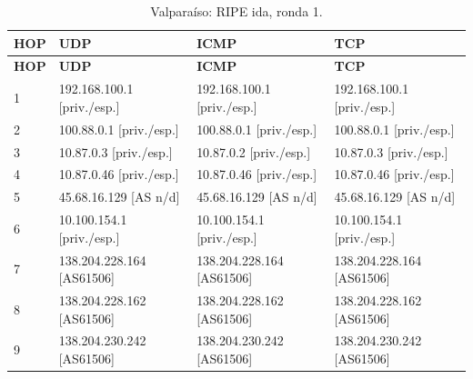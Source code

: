 \begin{longtable}{p{0.95cm}p{4.716666666666667cm}p{4.716666666666667cm}p{4.716666666666667cm}}
\caption{Valparaíso: RIPE ida, ronda 1.}\label{anexo:ripe:138.204.230.242:1} \\
\toprule
\textbf{HOP} & \textbf{UDP} & \textbf{ICMP} & \textbf{TCP} \\ \midrule
\endfirsthead
\toprule
\textbf{HOP} & \textbf{UDP} & \textbf{ICMP} & \textbf{TCP} \\ \midrule
\endhead
1 & 192.168.100.1 [priv./esp.] & 192.168.100.1 [priv./esp.] & 192.168.100.1 [priv./esp.] \\
2 & 100.88.0.1 [priv./esp.] & 100.88.0.1 [priv./esp.] & 100.88.0.1 [priv./esp.] \\
3 & 10.87.0.3 [priv./esp.] & 10.87.0.2 [priv./esp.] & 10.87.0.3 [priv./esp.] \\
4 & 10.87.0.46 [priv./esp.] & 10.87.0.46 [priv./esp.] & 10.87.0.46 [priv./esp.] \\
5 & 45.68.16.129 [AS n/d] & 45.68.16.129 [AS n/d] & 45.68.16.129 [AS n/d] \\
6 & 10.100.154.1 [priv./esp.] & 10.100.154.1 [priv./esp.] & 10.100.154.1 [priv./esp.] \\
7 & 138.204.228.164 [AS61506] & 138.204.228.164 [AS61506] & 138.204.228.164 [AS61506] \\
8 & 138.204.228.162 [AS61506] & 138.204.228.162 [AS61506] & 138.204.228.162 [AS61506] \\
9 & 138.204.230.242 [AS61506] & 138.204.230.242 [AS61506] & 138.204.230.242 [AS61506] \\
\bottomrule
\end{longtable}
\endgroup
\begingroup
\fontsize{9}{11}\selectfont
